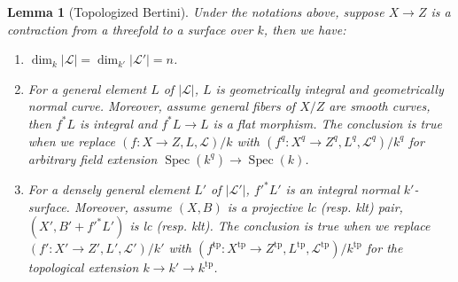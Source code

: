 \documentclass[letterpaper,reqno,12pt]{amsart}
\DeclareMathOperator{\Spec}{Spec}
\newcommand{\tp}{\mathrm{tp}}
\numberwithin{equation}{section}
\theoremstyle{plain}
\newtheorem{lemma}[theorem]{Lemma}
\begin{document}
\begin{lemma}[Topologized Bertini]\label{topologicalbertini}%
    Under the notations above, suppose $X\to Z$ is a contraction from a threefold to a surface over $k$, then we have:
    \begin{enumerate}
        \item $\dim_k |\mathscr L|=\dim_{k'}|\mathscr L'|=n$.%
        \item For a general element $L$ of $|\mathscr L|$, $L$ is geometrically integral and geometrically normal curve. Moreover, assume general fibers of $X/Z$ are smooth curves, then $f^*L$ is integral and $f^*L\to L$ is a flat morphism. The conclusion is true when we replace $(f:X\to Z,L,\mathscr L)/k$ with $(f^q:X^q\to Z^q,L^q,\mathscr L^q)/k^q$ for arbitrary field extension $\Spec(k^q)\to\Spec(k)$.
        \item For a densely general element $L'$ of $|\mathscr L'|$, $f'^* L'$ is an integral normal $k'$-surface. Moreover, assume $(X,B)$ is a projective lc (resp. klt) pair, $(X',B'+f'^* L')$ is lc (resp. klt). The conclusion is true when we replace $(f':X'\to Z',L',\mathscr L')/k'$ with $(f^\tp:X^\tp\to Z^\tp,L^\tp,\mathscr L^\tp)/k^\tp$ for the topological extension $k\to k'\to k^\tp$.
    \end{enumerate}
\end{lemma}
\end{document}
